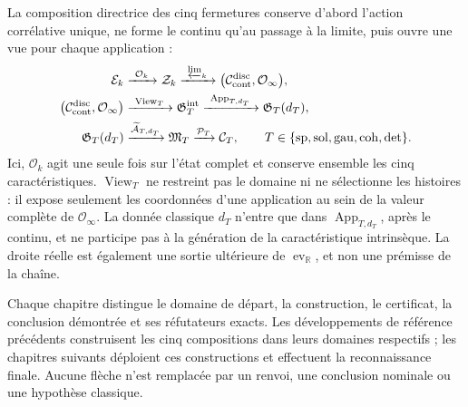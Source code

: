 La composition directrice des cinq fermetures conserve d’abord l’action corrélative unique, ne forme le continu qu’au passage à la limite, puis ouvre une vue pour chaque application :
\[
\begin{aligned}
 \mathcal E_k&\xrightarrow{\ \mathcal O_k\ }\mathcal Z_k
 \xrightarrow{\ \varprojlim_k\ }
 \bigl(\mathcal C_{\rm cont}^{\rm disc},\mathcal O_\infty\bigr),\\
 \bigl(\mathcal C_{\rm cont}^{\rm disc},\mathcal O_\infty\bigr)
 &\xrightarrow{\ \operatorname{View}_T\ }\mathfrak G_T^{\rm int}
 \xrightarrow{\ \operatorname{App}_{T,d_T}\ }\mathfrak G_T(d_T),\\
 \mathfrak G_T(d_T)&
 \xrightarrow{\widetilde{\mathcal A}_{T,d_T}}\mathfrak M_T
 \xrightarrow{\mathcal P_T}\mathcal C_T,
 \qquad T\in\{\mathrm{sp,sol,gau,coh,det}\}.
\end{aligned}
\]
Ici, $\mathcal O_k$ agit une seule fois sur l’état complet et conserve ensemble les cinq caractéristiques. $\operatorname{View}_T$ ne restreint pas le domaine ni ne sélectionne les histoires : il expose seulement les coordonnées d’une application au sein de la valeur complète de $\mathcal O_\infty$. La donnée classique $d_T$ n’entre que dans $\operatorname{App}_{T,d_T}$, après le continu, et ne participe pas à la génération de la caractéristique intrinsèque. La droite réelle est également une sortie ultérieure de $\operatorname{ev}_{\mathbb R}$, et non une prémisse de la chaîne.

Chaque chapitre distingue le domaine de départ, la construction, le certificat, la conclusion démontrée et ses réfutateurs exacts. Les développements de référence précédents construisent les cinq compositions dans leurs domaines respectifs ; les chapitres suivants déploient ces constructions et effectuent la reconnaissance finale. Aucune flèche n’est remplacée par un renvoi, une conclusion nominale ou une hypothèse classique.
